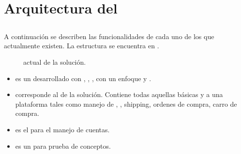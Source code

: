 \section{Arquitectura del \frameworkPC}\label{cap:arquitectura:section:arquitectura_framework}

\subsection{\packagesAS}

A continuación se describen las funcionalidades de cada uno de los \packagesAS que actualmente existen. La estructura se encuentra en .

\begin{figure}[H]
	\centering
	
	
	\caption{\architectureCPT actual de la solución.}
	\label{cap:avances:current_architecture}
\end{figure}
	\begin{itemize}
		\item
			\textbf{\eframeworkAF} es un \frameworkPC \ecommerceCOM desarrollado con \meteorNAME, \nodejsNAME, \mongodbNAME, con un enfoque \reactive y \realTimeINT.
		\item
			\textbf{\eframeworkCorePCKG} corresponde al \coreAS de la solución. Contiene todas aquellas \featuresCPT básicas y \templatesAS a una plataforma \ecommerceCOM tales como manejo de \itemsCOM, \sessionsINT, shipping, ordenes de compra, carro de compra.
		\item
			\textbf{\eframeworkAccountsPCKG} es el \moduleAS para el manejo de cuentas.
		\item
			\textbf{\eframeworkHelloWorldPCKG} es un \moduleAS para prueba de conceptos.
	\end{itemize}


